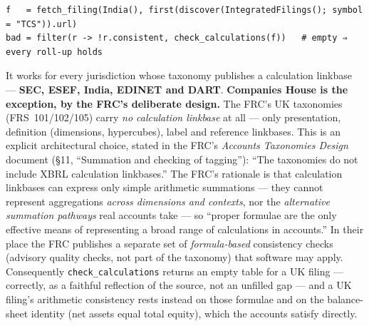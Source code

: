 \documentclass[11pt,a4paper]{report}
\begin{document}
\begin{lstlisting}
f   = fetch_filing(India(), first(discover(IntegratedFilings(); symbol = "TCS")).url)
bad = filter(r -> !r.consistent, check_calculations(f))   # empty ⇒ every roll-up holds
\end{lstlisting}

\noindent It works for every jurisdiction whose taxonomy publishes a calculation linkbase ---
\textbf{SEC, ESEF, India, EDINET and DART}. \textbf{Companies House is the exception, by the FRC's
deliberate design.} The FRC's UK taxonomies (FRS~101/102/105) carry \emph{no calculation linkbase} at
all --- only presentation, definition (dimensions, hypercubes), label and reference linkbases. This is
an explicit architectural choice, stated in the FRC's \emph{Accounts Taxonomies Design} document
(\S11, ``Summation and checking of tagging''): ``The taxonomies do not include XBRL calculation
linkbases.'' The FRC's rationale is that calculation linkbases can express only simple arithmetic
summations --- they cannot represent aggregations \emph{across dimensions and contexts}, nor the
\emph{alternative summation pathways} real accounts take --- so ``proper formulae are the only
effective means of representing a broad range of calculations in accounts.'' In their place the FRC
publishes a separate set of \emph{formula-based} consistency checks (advisory quality checks, not part
of the taxonomy) that software may apply. Consequently \texttt{check\_calculations} returns an empty
table for a UK filing --- correctly, as a faithful reflection of the source, not an unfilled gap ---
and a UK filing's arithmetic consistency rests instead on those formulae and on the balance-sheet
identity (net assets equal total equity), which the accounts satisfy directly.
\end{document}
